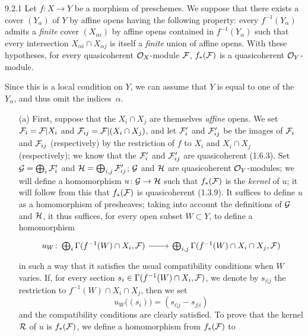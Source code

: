 \documentclass[../main.tex]{subfiles}
\begin{document}
\begin{env}[Proposition]{9.2.1} Let $f\colon X\to Y$ be a morphism of
preschemes.  We suppose that there exists a cover $(Y_\alpha)$ of $Y$ by affine
opens having the following property: every $f^{-1}(Y_\alpha)$ admits a
\emph{finite} cover $(X_{\alpha i})$ by affine opens contained in
$f^{-1}(Y_\alpha)$ such that every intersection $X_{\alpha i}\cap X_{\alpha j}$
is itself a \emph{finite} union of affine opens.  With these hypotheses, for
every quasicoherent $\mathcal{O}_X$-module $\mathcal{F}$, $f_\ast(\mathcal{F})$ is a
quasicoherent $\mathcal{O}_Y$-module.
\end{env}

Since this is a local condition on $Y$, we can assume that $Y$ is equal to one
of the $Y_\alpha$, and thus omit the indices~$\alpha$.

\begin{itemize}
\item[(a)] First, suppose that the $X_i\cap X_j$
are themselves \emph{affine} opens.  We set $\mathcal{F}_i=\mathcal{F}|X_i$ and
$\mathcal{F}_{ij}=\mathcal{F}|(X_i\cap X_j)$, and let $\mathcal{F}'_i$ and
$\mathcal{F}'_{ij}$ be the images of $\mathcal{F}_i$ and $\mathcal{F}_{ij}$
(respectively) by the restriction of $f$ to $X_i$ and $X_i\cap X_j$
(respectively); we know that the $\mathcal{F}'_i$ and $\mathcal{F}'_{ij}$ are
quasicoherent (1.6.3).  Set $\mathcal{G}=\bigoplus_i\mathcal{F}'_i$ and
$\mathcal{H}=\bigoplus_{i,j}\mathcal{F}'_{ij}$; $\mathcal{G}$ and $\mathcal{H}$ are
quasicoherent $\mathcal{O}_Y$-modules; we will define a homomorphism
$u\colon\mathcal{G}\to\mathcal{H}$ such that $f_\ast(\mathcal{F})$ is the
\emph{kernel} of $u$; it will follow from this that $f_\ast(\mathcal{F})$ is
quasicoherent (1.3.9).  It suffices to define $u$ as a homomorphism
of presheaves; taking into account the definitions of $\mathcal{G}$ and
$\mathcal{H}$, it thus suffices, for every open subset $W\subset Y$, to define a
homomorphism \[ \begin{tikzcd} {u_W\colon\bigoplus_i\Gamma(f^{-1}(W)\cap
X_i,\sheaf{F})}\ar[r] & {\bigoplus_{i,j}\Gamma(f^{-1}(W)\cap X_i\cap
X_j,\sheaf{F}) } \end{tikzcd} \] in such a way that it satisfies the usual
compatibility conditions when $W$ varies.  If, for every section
$s_i\in\Gamma(f^{-1}(W)\cap X_i, \mathcal{F})$, we denote by $s_{i|j}$ the
restriction to $f^{-1}(W)\cap X_i\cap X_j$, then we set \[
u_W\big((s_i)\big)=(s_{i|j}-s_{j|i}) \] and the compatibility conditions are
clearly satisfied.  To prove that the kernel $\mathcal{R}$ of $u$ is
$f_\ast(\mathcal{F})$, we define a homomorphism from $f_\ast(\mathcal{F})$ to

\end{itemize}
\end{document}
